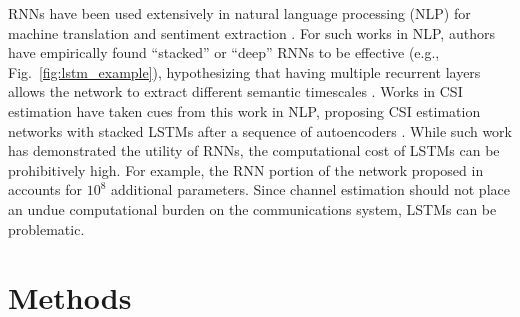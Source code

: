 RNNs have been used extensively in natural language processing (NLP) for machine translation \cite{ref:Sutskever2014seq2seq} and sentiment extraction \cite{ref:Irsoy2014opinion}. For such works in NLP, authors have empirically found ``stacked'' or ``deep'' RNNs to be effective (e.g., Fig.~\ref{fig:lstm_example}), hypothesizing that having multiple recurrent layers allows the network to extract different semantic timescales \cite{ref:Irsoy2014opinion, ref:Bengio2009Learning}. Works in CSI estimation have taken cues from this work in NLP, proposing CSI estimation networks with stacked LSTMs after a sequence of autoencoders \cite{ref:Wang2019CsiNetLSTM}. While such work has demonstrated the utility of RNNs, the computational cost of LSTMs can be prohibitively high. For example, the RNN portion of the network proposed in \cite{ref:Wang2019CsiNetLSTM} accounts for $10^8$ additional parameters. Since channel estimation should not place an undue computational burden on the communications system, LSTMs can be problematic.

\section{Methods}

